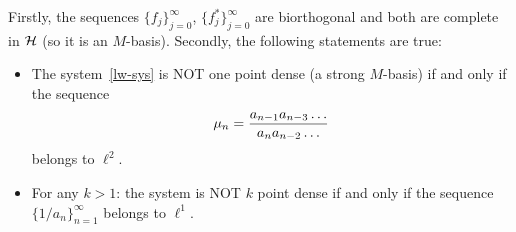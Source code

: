   \begin{theorem}
    \label{thm_katavolos}
    Firstly, the sequences $\{f_j\}_{j=0}^\infty$, $\{f^*_j\}_{j=0}^\infty$ are biorthogonal
      and both are complete in $\cal{H}$ (so it is an $M$-basis).
    Secondly, the following statements are true:
    \begin{itemize}
      \item  The system~\eqref{lw-sys} is NOT one point dense (a strong $M$-basis) if and only if the sequence
        \begin{equation}
          \mu_n = \frac{a_{n-1} a_{n-3} \dots}{a_{n} a_{n-2} \dots }\\
        \end{equation}
        belongs to $\ell^2$.
      \item For any $k>1$: the system is NOT $k$ point dense if and only if the sequence $\{1/a_n\}_{n=1}^\infty$ belongs to $\ell^1$.
    \end{itemize}
  \end{theorem}
